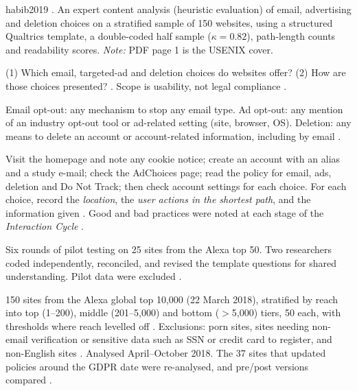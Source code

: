 \begin{papercard}{habib2019}
     . An expert content analysis (heuristic evaluation) of email, advertising and deletion choices on a stratified sample of 150 websites, using a structured Qualtrics template, a double-coded half sample ($\kappa=0.82$), path-length counts and readability scores. \emph{Note:} PDF page 1 is the USENIX cover.

 (1) Which email, targeted-ad and deletion choices do websites offer? (2) How are those choices presented? . Scope is usability, not legal compliance .

 Email opt-out: any mechanism to stop any email type. Ad opt-out: any mention of an industry opt-out tool or ad-related setting (site, browser, OS). Deletion: any means to delete an account or account-related information, including by email .

 Visit the homepage and note any cookie notice; create an account with an alias and a study e-mail; check the AdChoices page; read the policy for email, ads, deletion and Do Not Track; then check account settings for each choice. For each choice, record the \emph{location}, the \emph{user actions in the shortest path}, and the information given . Good and bad practices were noted at each stage of the \emph{Interaction Cycle} .

 Six rounds of pilot testing on 25 sites from the Alexa top 50. Two researchers coded independently, reconciled, and revised the template questions for shared understanding. Pilot data were excluded .

 150 sites from the Alexa global top 10,000 (22 March 2018), stratified by reach into top (1--200), middle (201--5,000) and bottom ($>$5,000) tiers, 50 each, with thresholds where reach levelled off . Exclusions: porn sites, sites needing non-email verification or sensitive data such as SSN or credit card to register, and non-English sites . Analysed April--October 2018. The 37 sites that updated policies around the GDPR date were re-analysed, and pre/post versions compared .


\end{papercard}
